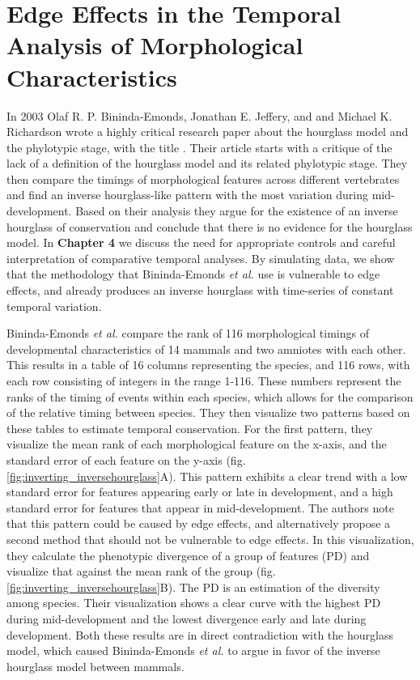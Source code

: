 \chapter{Edge Effects in the Temporal Analysis of Morphological Characteristics}\thumbforchapter
\newpage

In 2003 Olaf R. P. Bininda-Emonds, Jonathan E. Jeffery, and and Michael K. Richardson wrote a highly critical research paper about the hourglass model and the phylotypic stage, with the title \cite{OlafRP2003}. Their article starts with a critique of the lack of a definition of the hourglass model and its related phylotypic stage. They then compare the timings of morphological features across different vertebrates and find an inverse hourglass-like pattern with the most variation during mid-development. Based on their analysis they argue for the existence of an inverse hourglass of conservation and conclude that there is no evidence for the hourglass model. In \textbf{Chapter 4} we discuss the need for appropriate controls and careful interpretation of comparative temporal analyses. By simulating data, we show that the methodology that Bininda-Emonds \textit{et al.} use is vulnerable to edge effects, and already produces an inverse hourglass with time-series of constant temporal variation.

Bininda-Emonds \textit{et al.} compare the rank of 116 morphological timings of developmental characteristics of 14 mammals and two amniotes with each other. This results in a table of 16 columns representing the species, and 116 rows, with each row consisting of integers in the range 1-116. These numbers represent the ranks of the timing of events within each species, which allows for the comparison of the relative timing between species. They then visualize two patterns based on these tables to estimate temporal conservation. For the first pattern, they visualize the mean rank of each morphological feature on the x-axis, and the standard error of each feature on the y-axis (fig. \ref{fig:inverting_inversehourglass}A). This pattern exhibits a clear trend with a low standard error for features appearing early or late in development, and a high standard error for features that appear in mid-development. The authors note that this pattern could be caused by edge effects, and alternatively propose a second method that should not be vulnerable to edge effects. In this visualization, they calculate the phenotypic divergence of a group of features (PD) and visualize that against the mean rank of the group (fig. \ref{fig:inverting_inversehourglass}B). The PD is an estimation of the diversity among species. Their visualization shows a clear curve with the highest PD during mid-development and the lowest divergence early and late during development. Both these results are in direct contradiction with the hourglass model, which caused Bininda-Emonds \textit{et al.} to argue in favor of the inverse hourglass model between mammals.


